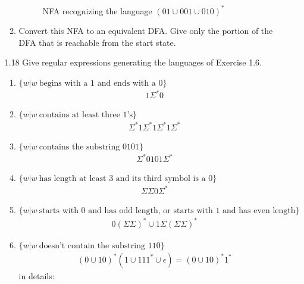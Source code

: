 \begin{enumerate}
\begin{enumerate}
\begin{figure}[H]
                        \caption{NFA recognizing the language $(01 \cup 001 \cup 010)^\ast$}
                    \end{figure}
              \item Convert this NFA to an equivalent DFA. Give only the portion of the DFA that is reachable from the start state.
          \end{enumerate}
    \item [1.18]
          Give regular expressions generating the languages of Exercise 1.6.
          \begin{enumerate}
              \item $\{w|w~ \text{begins with a }1\text{ and ends with a }0\}$
                    \begin{align*}
                        1\Sigma^*0
                    \end{align*}
              \item $\{w|w~ \text{contains at least three }1\text{'s}\}$
                    \begin{align*}
                        \Sigma^*1\Sigma^*1\Sigma^*1\Sigma^*
                    \end{align*}
              \item $\{w|w~ \text{contains the substring }0101\}$
                    \begin{align*}
                        \Sigma^*0101\Sigma^*
                    \end{align*}
              \item $\{w|w~ \text{has length at least }3\text{ and its third symbol is a }0\}$
                    \begin{align*}
                        \Sigma\Sigma0\Sigma^*
                    \end{align*}
              \item $\{w|w~ \text{starts with }0\text{ and has odd length, or starts with }1\text{ and has even length}\}$
                    \begin{align*}
                        0(\Sigma\Sigma)^* \cup 1\Sigma(\Sigma\Sigma)^*
                    \end{align*}
              \item $\{w|w~ \text{doesn't contain the substring }110\}$
                    \begin{align*}
                        (0 \cup 10)^\ast (1 \cup 111^\ast \cup \epsilon) = 
                        (0 \cup 10)^\ast 1^\ast
                    \end{align*}
                    in details:
                    

\end{enumerate}
\end{enumerate}
